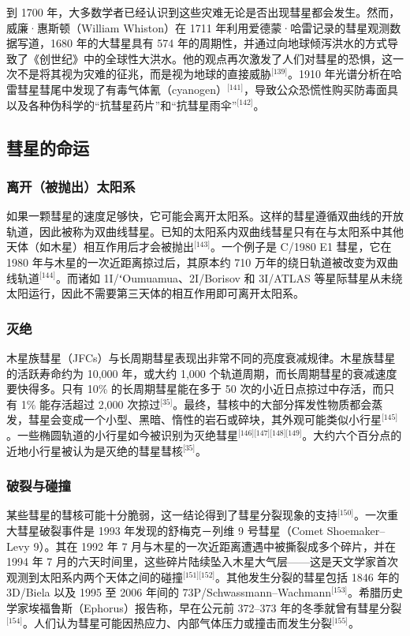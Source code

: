 到 1700 年，大多数学者已经认识到这些灾难无论是否出现彗星都会发生。然而，威廉·惠斯顿（William Whiston）在 1711 年利用爱德蒙·哈雷记录的彗星观测数据写道，1680 年的大彗星具有 574 年的周期性，并通过向地球倾泻洪水的方式导致了《创世纪》中的全球性大洪水。他的观点再次激发了人们对彗星的恐惧，这一次不是将其视为灾难的征兆，而是视为地球的直接威胁\(^\text{[139]}\)。1910 年光谱分析在哈雷彗星彗尾中发现了有毒气体氰（cyanogen）\(^\text{[141]}\)，导致公众恐慌性购买防毒面具以及各种伪科学的“抗彗星药片”和“抗彗星雨伞”\(^\text{[142]}\)。
\subsection{彗星的命运}
\subsubsection{离开（被抛出）太阳系}
如果一颗彗星的速度足够快，它可能会离开太阳系。这样的彗星遵循双曲线的开放轨道，因此被称为双曲线彗星。已知的太阳系内双曲线彗星只有在与太阳系中其他天体（如木星）相互作用后才会被抛出\(^\text{[143]}\)。一个例子是 C/1980 E1 彗星，它在 1980 年与木星的一次近距离掠过后，其原本约 710 万年的绕日轨道被改变为双曲线轨道\(^\text{[144]}\)。而诸如 1I/ʻOumuamua、2I/Borisov 和 3I/ATLAS 等星际彗星从未绕太阳运行，因此不需要第三天体的相互作用即可离开太阳系。
\subsubsection{灭绝}
木星族彗星（JFCs）与长周期彗星表现出非常不同的亮度衰减规律。木星族彗星的活跃寿命约为 10,000 年，或大约 1,000 个轨道周期，而长周期彗星的衰减速度要快得多。只有 10\% 的长周期彗星能在多于 50 次的小近日点掠过中存活，而只有 1\% 能存活超过 2,000 次掠过\(^\text{[35]}\)。最终，彗核中的大部分挥发性物质都会蒸发，彗星会变成一个小型、黑暗、惰性的岩石或碎块，其外观可能类似小行星\(^\text{[145]}\)。一些椭圆轨道的小行星如今被识别为灭绝彗星\(^\text{[146][147][148][149]}\)。大约六个百分点的近地小行星被认为是灭绝的彗星彗核\(^\text{[35]}\)。
\subsubsection{破裂与碰撞}
某些彗星的彗核可能十分脆弱，这一结论得到了彗星分裂现象的支持\(^\text{[150]}\)。一次重大彗星破裂事件是 1993 年发现的舒梅克－列维 9 号彗星（Comet Shoemaker–Levy 9）。其在 1992 年 7 月与木星的一次近距离遭遇中被撕裂成多个碎片，并在 1994 年 7 月的六天时间里，这些碎片陆续坠入木星大气层——这是天文学家首次观测到太阳系内两个天体之间的碰撞\(^\text{[151][152]}\)。其他发生分裂的彗星包括 1846 年的 3D/Biela 以及 1995 至 2006 年间的 73P/Schwassmann–Wachmann\(^\text{[153]}\)。希腊历史学家埃福鲁斯（Ephorus）报告称，早在公元前 372–373 年的冬季就曾有彗星分裂\(^\text{[154]}\)。人们认为彗星可能因热应力、内部气体压力或撞击而发生分裂\(^\text{[155]}\)。

